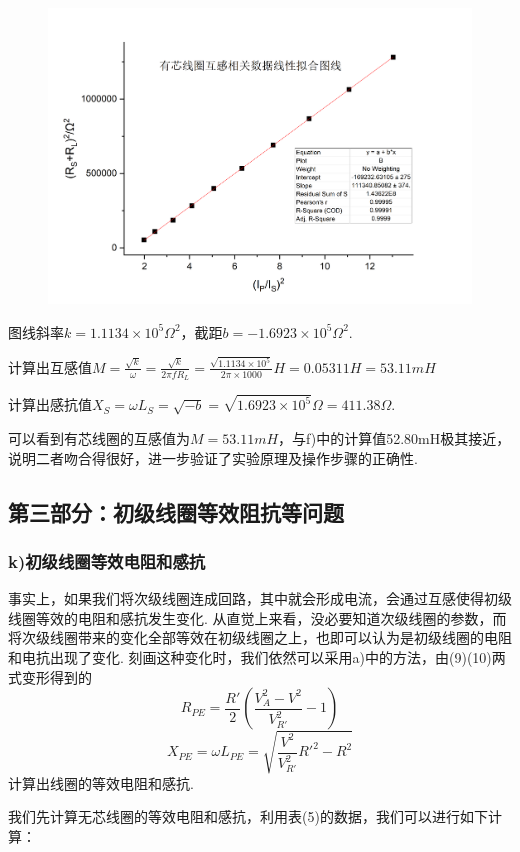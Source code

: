 \documentclass[UTF8]{ctexart}
\begin{document}
\begin{figure}[H]\begin{center}
        \includegraphics*[scale = 0.6]{linear2.png}
\end{center}\end{figure}

图线斜率$k=1.1134\times 10^5\Omega^2$，截距$b=-1.6923\times 10^5\Omega^2$.\\ \par
计算出互感值$\displaystyle{M=\frac{\sqrt{k}}{\omega}=\frac{\sqrt{k}}{2\pi f R_L}}=\frac{\sqrt{1.1134\times 10^5}}{2\pi \times 1000}H=0.05311H=53.11mH$\par
计算出感抗值$\displaystyle{X_S=\omega L_S=\sqrt{-b}=\sqrt{1.6923\times 10^5}}\Omega=411.38\Omega$.\par
可以看到有芯线圈的互感值为$M=53.11mH$，与f)中的计算值52.80mH极其接近，说明二者吻合得很好，进一步验证了实验原理及操作步骤的正确性.

\subsection*{第三部分：初级线圈等效阻抗等问题}
\subsubsection*{k)初级线圈等效电阻和感抗}
事实上，如果我们将次级线圈连成回路，其中就会形成电流，会通过互感使得初级线圈等效的电阻和感抗发生变化. 从直觉上来看，没必要知道次级线圈的参数，而将次级线圈带来的变化全部等效在初级线圈之上，也即可以认为是初级线圈的电阻和电抗出现了变化. 刻画这种变化时，我们依然可以采用a)中的方法，由(9)(10)两式变形得到的
\[R_{PE}=\frac{R'}{2}(\frac{V_A^2-V^2}{V_{R'}^2}-1)\]
\[X_{PE}=\omega L_{PE}=\sqrt{\frac{V^2}{V_{R'}^2}R'^2-R^2}\]
计算出线圈的等效电阻和感抗. \par
我们先计算无芯线圈的等效电阻和感抗，利用表(5)的数据，我们可以进行如下计算：
\end{document}
